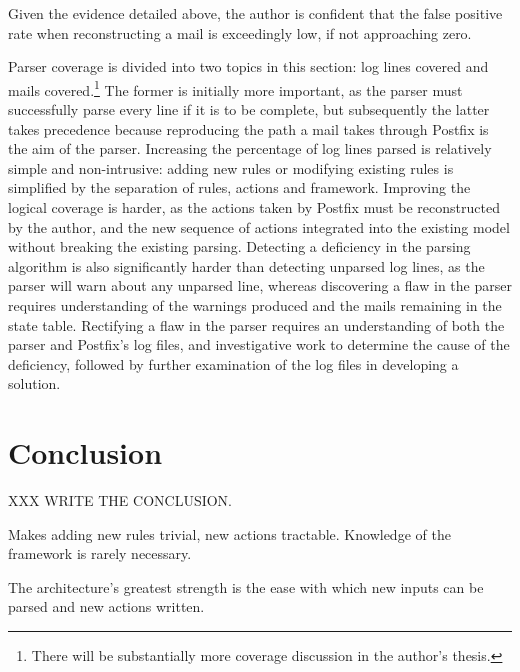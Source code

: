 \documentclass[draft]{svmult}
\begin{document}
Given the evidence detailed above, the author is confident that the false
positive rate when reconstructing a mail is exceedingly low, if not
approaching zero.

Parser coverage is divided into two topics in this section: log lines
covered and mails covered.\footnote{There will be substantially more
coverage discussion in the author's thesis.}  The former is initially more
important, as the parser must successfully parse every line if it is to be
complete, but subsequently the latter takes precedence because reproducing
the path a mail takes through Postfix is the aim of the parser.  Increasing
the percentage of log lines parsed is relatively simple and non-intrusive:
adding new rules or modifying existing rules is simplified by the
separation of rules, actions and framework.  Improving the logical coverage
is harder, as the actions taken by Postfix must be reconstructed by the
author, and the new sequence of actions integrated into the existing model
without breaking the existing parsing.  Detecting a deficiency in the
parsing algorithm is also significantly harder than detecting unparsed log
lines, as the parser will warn about any unparsed line, whereas discovering
a flaw in the parser requires understanding of the warnings produced and
the mails remaining in the state table.  Rectifying a flaw in the parser
requires an understanding of both the parser and Postfix's log files, and
investigative work to determine the cause of the deficiency, followed by
further examination of the log files in developing a solution.

\section{Conclusion}

XXX WRITE THE CONCLUSION\@.

Makes adding new rules trivial, new actions tractable.  Knowledge of the
framework is rarely necessary.

The architecture's greatest strength is the ease with which new inputs
can be parsed and new actions written.



\label{bibliography}

\renewcommand{\glossarytitle}{\section{Glossary}\label{Glossary}}
\printglossary{}

\end{document}
